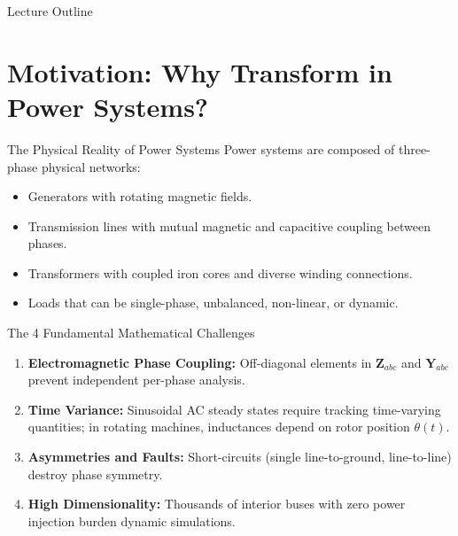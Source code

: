 \titleframe

\begin{frame}{Lecture Outline}
    \tableofcontents
\end{frame}

\section{Motivation: Why Transform in Power Systems?}

\begin{frame}[allowframebreaks]{The Physical Reality of Power Systems}
    Power systems are composed of three-phase physical networks:
    \begin{itemize}
        \item Generators with rotating magnetic fields.
        \item Transmission lines with mutual magnetic and capacitive coupling between phases.
        \item Transformers with coupled iron cores and diverse winding connections.
        \item Loads that can be single-phase, unbalanced, non-linear, or dynamic.
    \end{itemize}

    \begin{alertblock}{The 4 Fundamental Mathematical Challenges}
        \begin{enumerate}
            \item \textbf{Electromagnetic Phase Coupling:} Off-diagonal elements in $\mathbf{Z}_{abc}$ and $\mathbf{Y}_{abc}$ prevent independent per-phase analysis.
            \item \textbf{Time Variance:} Sinusoidal AC steady states require tracking time-varying quantities; in rotating machines, inductances depend on rotor position $\theta(t)$.
            \item \textbf{Asymmetries and Faults:} Short-circuits (single line-to-ground, line-to-line) destroy phase symmetry.
            \item \textbf{High Dimensionality:} Thousands of interior buses with zero power injection burden dynamic simulations.
        \end{enumerate}
    \end{alertblock}
\end{frame}

